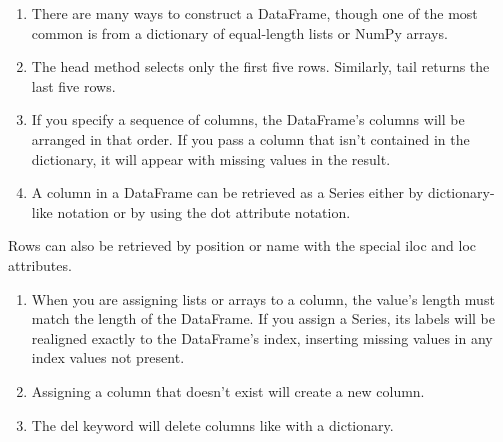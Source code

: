 \begin{enumerate}
    \item There are many ways to construct a DataFrame, though one of the most common is from a dictionary of equal-length lists or NumPy arrays.
    \item The head method selects only the first five rows. Similarly, tail returns the last five rows.
    \item If you specify a sequence of columns, the DataFrame's columns will be arranged in
          that order. If you pass a column that isn't contained in the dictionary, it will appear with missing values in the result.
    \item A column in a DataFrame can be retrieved as a Series either by dictionary-like notation or by using the dot attribute notation.
\end{enumerate}


Rows can also be retrieved by position or name with the special iloc and loc attributes.

\begin{enumerate}
    \item When you are assigning lists or arrays to a column, the value's length must match the length of the DataFrame. If you assign a Series, its labels will be realigned exactly to the DataFrame's index, inserting missing values in any index values not present.
    \item Assigning a column that doesn't exist will create a new column.
    \item The del keyword will delete columns like with a dictionary.
\end{enumerate}



